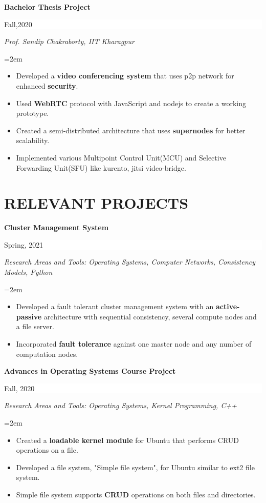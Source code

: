 \documentclass[paper=a4,fontsize=10pt]{scrartcl} %
\newcommand{\sepspace}{\vspace*{1em}}		%
\newcommand{\NewPart}[1]{\section*{\uppercase{#1}}}
\newcommand{\EducationEntry}[4]{
		\noindent \textbf{#1} \hfill      %
		\colorbox{White}{%
			\parbox{6em}{%
			\hfill\color{Black}#2}} \par  %
		\noindent \textit{#3} \par        %
		\noindent\hangindent=2em\hangafter=0 \small #4 %
		\normalsize \par}
\begin{document}
\EducationEntry{Bachelor Thesis Project}{Fall,2020}{Prof. Sandip Chakraborty, IIT Kharagpur}{
\begin{itemize}[noitemsep]
  \item Developed a \textbf{video conferencing system} that uses p2p network for enhanced \textbf{security}.
  \item Used \textbf{WebRTC} protocol with JavaScript and nodejs to create a working prototype.
  \item Created a semi-distributed architecture that uses \textbf{supernodes} for better scalability.
  \item Implemented various Multipoint Control Unit(MCU) and Selective Forwarding Unit(SFU) like kurento, jitsi video-bridge.
\end{itemize}
}


\NewPart{Relevant Projects}{}

\EducationEntry{Cluster Management System}{Spring, 2021}{Research Areas and Tools: Operating Systems, Computer Networks, Consistency Models, Python}{
\begin{itemize}[noitemsep]
\item Developed a fault tolerant cluster management system with an \textbf{active-passive} architecture with sequential consistency, several compute nodes and a file server.
\item Incorporated \textbf{fault tolerance} against one master node and any number of computation nodes.
\end{itemize}
}


\EducationEntry{Advances in Operating Systems Course Project}{Fall, 2020}{Research Areas and Tools: Operating Systems, Kernel Programming, C++}{
\begin{itemize}[noitemsep]
  \item Created a \textbf{loadable kernel module} for Ubuntu that performs CRUD operations on a file.
  \item Developed a file system, "Simple file system", for Ubuntu similar to ext2 file system.
  \item Simple file system supports \textbf{CRUD} operations on both files and directories.
\end{itemize}
}
\newpage
\end{document}
